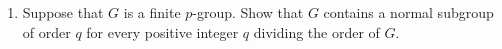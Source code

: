 \documentclass[12pt]{article}
\begin{document}
\begin{enumerate}
\item Suppose that $G$ is a finite $p$-group.
      Show that $G$ contains a normal subgroup of order $q$ for every positive integer $q$ dividing the
      order of $G$. 


\end{enumerate}
\end{document}
